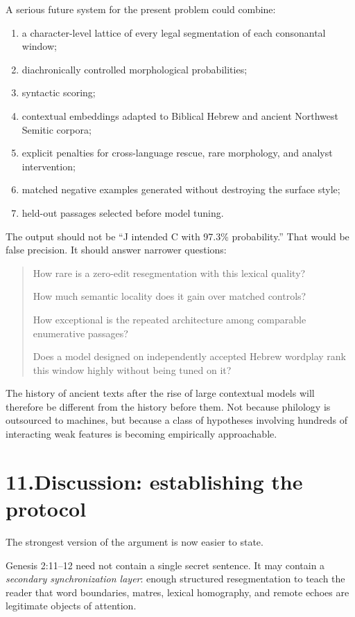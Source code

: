 A serious future system for the present problem could combine:

\begin{enumerate}
\item a character-level lattice of every legal segmentation of each consonantal window;
\item diachronically controlled morphological probabilities;
\item syntactic scoring;
\item contextual embeddings adapted to Biblical Hebrew and ancient Northwest Semitic corpora;
\item explicit penalties for cross-language rescue, rare morphology, and analyst intervention;
\item matched negative examples generated without destroying the surface style;
\item held-out passages selected before model tuning.
\end{enumerate}

The output should not be ``J intended C with 97.3\% probability.''  That would be false precision.  It should answer narrower questions:

\begin{quote}
How rare is a zero-edit resegmentation with this lexical quality?

How much semantic locality does it gain over matched controls?

How exceptional is the repeated  architecture among comparable enumerative passages?

Does a model designed on independently accepted Hebrew wordplay rank this window highly without being tuned on it?
\end{quote}

The history of ancient texts after the rise of large contextual models will therefore be different from the history before them.  Not because philology is outsourced to machines, but because a class of hypotheses involving hundreds of interacting weak features is becoming empirically approachable.

\section*{11.\quad Discussion: establishing the protocol}

The strongest version of the argument is now easier to state.

Genesis 2:11--12 need not contain a single secret sentence.  It may contain a \emph{secondary synchronization layer}: enough structured resegmentation to teach the reader that word boundaries, matres, lexical homography, and remote echoes are legitimate objects of attention.

